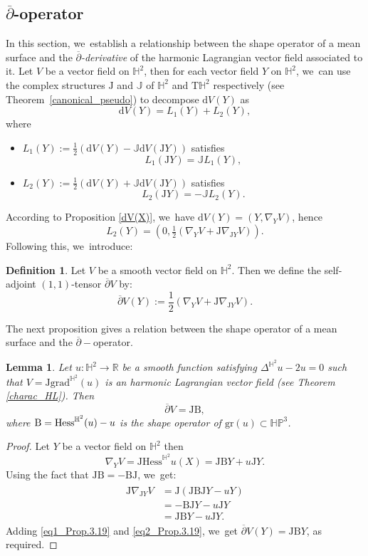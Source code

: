 \documentclass[11pt]{article}
\makeatletter
\DeclareRobustCommand{\mathbbm}[1]{\csname jepbb@#1\endcsname}
\theoremstyle{plain}
\newtheorem{lemma}[cor]{Lemma}
\theoremstyle{definition}
\newtheorem{defi}[cor]{Definition}
\newcommand{\HP}{\mathbb{HP}^3}
\newcommand{\grad}{\mathrm{grad}^{\mathbb{H}^2}}
\newcommand{\hess}{\mathrm{Hess}^{\mathbb{H}^2}}
\newcommand{\J}{\mathrm{J}}
\newcommand{\B}{\mathrm{B}}
\makeatother
\begin{document}
\subsection{\texorpdfstring{$\overline{\partial}$-operator}{dbar-operator}}\label{Sec_dbar_operator}
In this section, we~establish a relationship between the shape operator of a mean surface and the \emph{$\overline{\partial}$-derivative} of the harmonic Lagrangian vector field associated to it. Let $V$ be a vector field on $\mathbb{H}^2$, then for each vector field $Y$ on $\mathbb{H}^2$, we~can use the complex structures $\J$ and $\mathbb{J}$ of $\mathbb{H}^2$ and $\mathrm{T}\mathbb{H}^2$ respectively (see Theorem~\ref{canonical_pseudo}) to decompose $\mathrm{d}V(Y)$ as
\[
\mathrm{d}V(Y)=L_1(Y)+L_2(Y),
\]
where \begin{itemize}
\item $L_1(Y):=\frac{1}{2}(\mathrm{d}V(Y)-\mathbb{J}\mathrm{d}V(\J Y))$ satisfies
\[
L_1(\J Y)=\mathbb{J}L_1(Y),
\]
\item $L_2(Y):=\frac{1}{2}(\mathrm{d}V(Y)+\mathbb{J}\mathrm{d}V(\J Y))$ satisfies
\[
L_2(\J Y)=-\mathbb{J}L_2(Y).
\]
\end{itemize}
According to Proposition \ref{dV(X)}, we~have $\mathrm{d}V(Y)=(Y,\nabla_YV)$, hence
\[
L_2(Y)=(0,\tfrac{1}{2}(\nabla_YV+\J\nabla_{\J Y}V)).
\]
Following this, we~introduce:
\begin{defi}
Let $V$ be a smooth vector field on $\mathbb{H}^2$. Then we define the self-adjoint $(1,1)$-tensor $\overline{\partial}V$ by:
\begin{equation}\label{dbar_H2}
\overline{\partial}V(Y):=\frac{1}{2}(\nabla_YV+\J\nabla_{\J Y}V).
\end{equation}
\end{defi}
The next proposition gives a relation between the shape operator of a mean surface and the $\overline{\partial}-$operator.
\begin{lemma}\label{d_bar_and_shape_operator}
Let $u:\mathbb{H}^2\to\mathbb{R}$ be a smooth function satisfying $\Delta^{\mathbb{H}^2} u-2u=0$ such that $V=\J\grad(u)$ is an harmonic Lagrangian vector field (see Theorem
\ref{charac_HL}). Then
\[
\overline{\partial}V=\J\B,
\]
where $\B=\hess(u)-u\mathbbm{1}$ is the shape operator of $\mathrm{gr}(u)\subset\HP$.
\end{lemma}
\begin{proof}
Let $Y$ be a vector field on $\mathbb{H}^2$ then
\begin{equation}\label{eq1_Prop.3.19}
\nabla_YV=\J\hess u(X)=\J\B Y+u\J Y.
\end{equation}
Using the fact that $\J \B=-\B\J$, we~get:
\begin{align}\label{eq2_Prop.3.19}
\begin{split}
\J\nabla_{\J Y}V&=\J(\J \B \J Y-uY)\\
&=-\B \J Y-u\J Y\\
&=\J \B Y-u\J Y.
\end{split}
\end{align}
Adding \eqref{eq1_Prop.3.19} and \eqref{eq2_Prop.3.19}, we~get $ \overline{\partial}V(Y)=\J \B Y$, as required. \end{proof}
\end{document}
